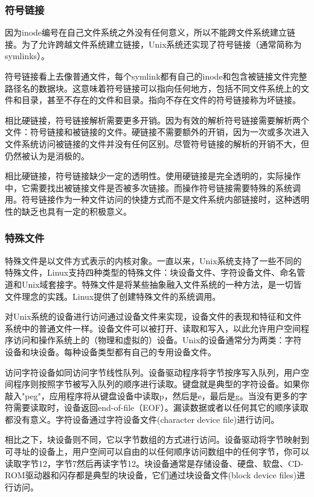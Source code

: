 \subsubsection{符号链接}

因为inode编号在自己文件系统之外没有任何意义，所以不能跨文件系统建立链接。为了允许跨越文件系统建立链接，Unix系统还实现了符号链接（通常简称为symlinks）。

符号链接看上去像普通文件，每个symlink都有自己的inode和包含被链接文件完整路径名的数据块。这意味着符号链接可以指向任何地方，包括不同文件系统上的文件和目录，甚至不存在的文件和目录。指向不存在文件的符号链接称为坏链接。

相比硬链接，符号链接解析需要更多开销。因为有效的解析符号链接需要解析两个文件：符号链接和被链接的文件。硬链接不需要额外的开销，因为一次或多次进入文件系统访问被链接的文件并没有任何区别。尽管符号链接的解析的开销不大，但仍然被认为是消极的。

相比硬链接，符号链接缺少一定的透明性。使用硬链接是完全透明的，实际操作中，它需要找出被链接文件是否被多次链接。而操作符号链接需要特殊的系统调用。符号链接作为一种文件访问的快捷方式而不是文件系统内部链接时，这种透明性的缺乏也具有一定的积极意义。

\subsubsection{特殊文件}

特殊文件是以文件方式表示的内核对象。一直以来，Unix系统支持了一些不同的特殊文件，Linux支持四种类型的特殊文件：块设备文件、字符设备文件、命名管道和Unix域套接字。特殊文件是将某些抽象融入文件系统的一种方法，是一切皆文件理念的实践。Linux提供了创建特殊文件的系统调用。

对Unix系统的设备进行访问通过设备文件来实现，设备文件的表现和特征和文件系统中的普通文件一样。设备文件可以被打开、读取和写入，以此允许用户空间程序访问和操作系统上的（物理和虚拟的）设备。Unix的设备通常分为两类：字符设备和块设备。每种设备类型都有自己的专用设备文件。

访问字符设备如同访问字节线性队列。设备驱动程序将字节按序写入队列，用户空间程序则按照字节被写入队列的顺序进行读取。键盘就是典型的字符设备。如果你敲入"peg"，应用程序将从键盘设备中读取p，然后是e，最后是g。当没有更多的字符需要读取时，设备返回end-of-file（EOF）。漏读数据或者以任何其它的顺序读取都没有意义。字符设备通过字符设备文件(character device file)进行访问。

相比之下，块设备则不同，它以字节数组的方式进行访问。设备驱动将字节映射到可寻址的设备上，用户空间可以自由的以任何顺序访问数组中的任何字节，你可以读取字节12，字节7然后再读字节12。块设备通常是存储设备、硬盘、软盘、CD-ROM驱动器和闪存都是典型的块设备，它们通过块设备文件(block device files)进行访问。


